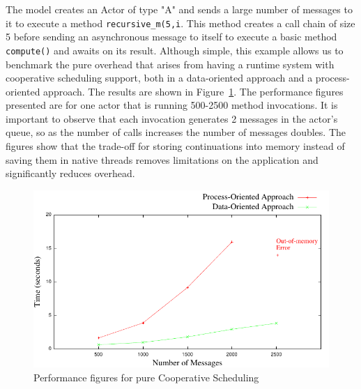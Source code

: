 \par The model creates an Actor of type "A" and sends a large number of messages to it to execute a method \lstinline|recursive_m(5,i|. This method creates a call chain of size 5 before sending an asynchronous message to itself to execute a basic method \lstinline|compute()| and awaits on its result. Although simple, this example allows us to benchmark the pure overhead that arises from having a runtime system with cooperative scheduling support, both in a data-oriented approach and a process-oriented approach. The results are shown in Figure~\ref{jj}. The performance figures presented are for one actor that is running 500-2500 method invocations. It is important to observe that each invocation generates 2 messages in the actor's queue, so as the number of calls increases the number of messages doubles. The figures show that the trade-off for storing continuations into memory instead of saving them in native threads removes limitations on the application and significantly reduces overhead. 

\begin{figure}
	\centering
	\includegraphics[scale=.68]{jaj8.pdf}
	\caption{Performance figures for pure Cooperative Scheduling}
	\label{jj}
\end{figure}

